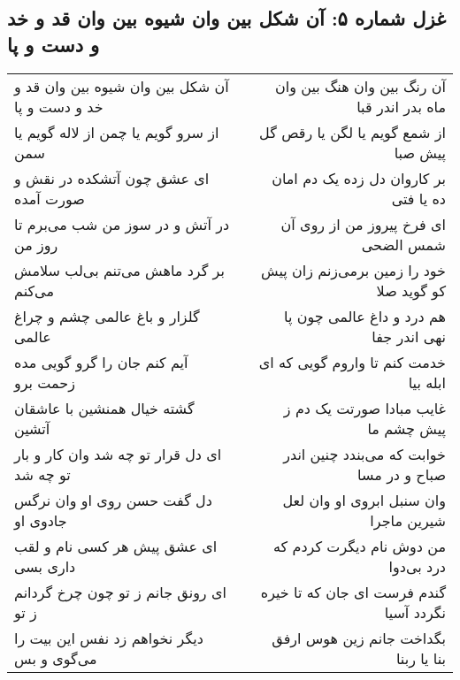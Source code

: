 \begin{center}
\section*{غزل شماره ۵: آن شکل بین وان شیوه بین وان قد و خد و دست و پا}
\label{sec:0005}
\begin{longtable}{l p{0.5cm} r}
آن شکل بین وان شیوه بین وان قد و خد و دست و پا
&&
آن رنگ بین وان هنگ بین وان ماه بدر اندر قبا
\\
از سرو گویم یا چمن از لاله گویم یا سمن
&&
از شمع گویم یا لگن یا رقص گل پیش صبا
\\
ای عشق چون آتشکده در نقش و صورت آمده
&&
بر کاروان دل زده یک دم امان ده یا فتی
\\
در آتش و در سوز من شب می‌برم تا روز من
&&
ای فرخ پیروز من از روی آن شمس الضحی
\\
بر گرد ماهش می‌تنم بی‌لب سلامش می‌کنم
&&
خود را زمین برمی‌زنم زان پیش کو گوید صلا
\\
گلزار و باغ عالمی چشم و چراغ عالمی
&&
هم درد و داغ عالمی چون پا نهی اندر جفا
\\
آیم کنم جان را گرو گویی مده زحمت برو
&&
خدمت کنم تا واروم گویی که ای ابله بیا
\\
گشته خیال همنشین با عاشقان آتشین
&&
غایب مبادا صورتت یک دم ز پیش چشم ما
\\
ای دل قرار تو چه شد وان کار و بار تو چه شد
&&
خوابت که می‌بندد چنین اندر صباح و در مسا
\\
دل گفت حسن روی او وان نرگس جادوی او
&&
وان سنبل ابروی او وان لعل شیرین ماجرا
\\
ای عشق پیش هر کسی نام و لقب داری بسی
&&
من دوش نام دیگرت کردم که درد بی‌دوا
\\
ای رونق جانم ز تو چون چرخ گردانم ز تو
&&
گندم فرست ای جان که تا خیره نگردد آسیا
\\
دیگر نخواهم زد نفس این بیت را می‌گوی و بس
&&
بگداخت جانم زین هوس ارفق بنا یا ربنا
\\
\end{longtable}
\end{center}
